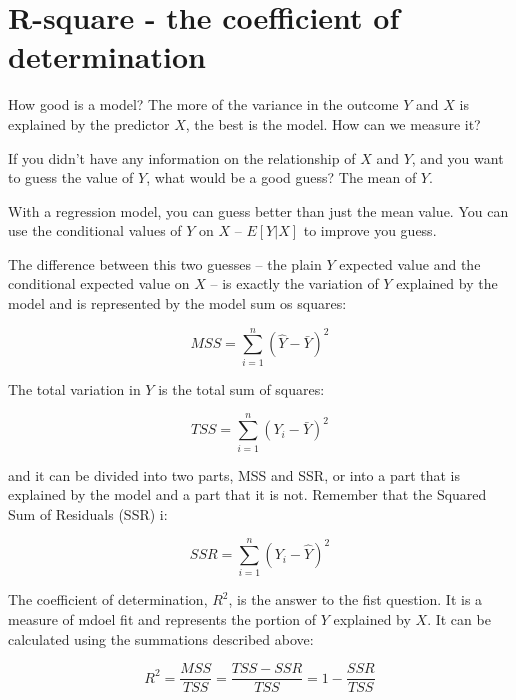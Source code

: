 \documentclass[11pt]{article}
\begin{document}
\section*{R-square - the coefficient of determination}

How good is a model? The more of the variance in the outcome $Y$ and $X$ is explained by the predictor $X$, the best is the model. How can we measure it?

If you didn't have any information on the relationship of $X$ and $Y$, and you want to guess the value of $Y$, what would be a good guess? The mean of $Y$.

With a regression model, you can guess better than just the mean value. You can use the conditional values of $Y$ on $X$ -- $E[Y|X]$ to improve you guess.

The difference between this two guesses -- the plain $Y$ expected value and the conditional expected value on $X$ -- is exactly the variation of $Y$ explained by the model and is represented by the model sum os squares:

\[MSS = \sum_{i=1}^n (\hat Y - \bar Y)^2 \]

The total variation in $Y$ is the total sum of squares:

\[TSS = \sum_{i=1}^n (Y_i - \bar Y)^2 \]

and it can be divided into two parts, MSS and SSR, or into a part that is explained by the model and a part that it is not. Remember that the Squared Sum of Residuals (SSR) i:

\[SSR = \sum_{i=1}^n (Y_i - \hat Y)^2 \]

The coefficient of determination, $R^2$, is the answer to the fist question. It is a measure of mdoel fit and represents the portion of $Y$ explained by $X$. It can be calculated using the summations described above:

\[R^2 = \frac{MSS}{TSS} = \frac{TSS - SSR}{TSS} = 1 - \frac{SSR}{TSS}\]
 
\end{document}

